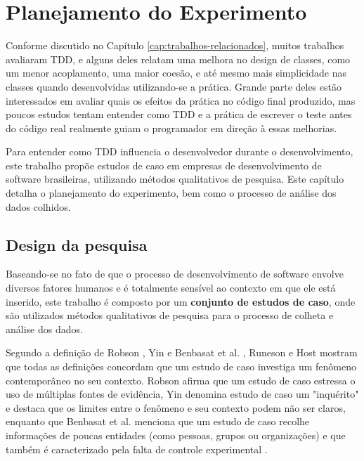 \chapter{Planejamento do Experimento}
\label{cap:planejamento}

Conforme discutido no Capítulo \ref{cap:trabalhos-relacionados}, muitos 
trabalhos avaliaram TDD, e alguns deles relatam uma melhora
no design de classes, como um menor acoplamento, uma maior coesão, e até mesmo
mais simplicidade nas classes quando desenvolvidas utilizando-se a prática. 
Grande parte deles estão interessados em avaliar quais os efeitos da prática
no código final produzido, mas poucos estudos tentam entender como TDD e a
prática de escrever o teste antes do código real realmente guiam o programador 
em direção à essas melhorias.

Para entender como TDD influencia o desenvolvedor durante o desenvolvimento,
este trabalho propõe estudos de caso em empresas de desenvolvimento de
software brasileiras, utilizando métodos qualitativos de pesquisa.
Este capítulo detalha o planejamento do experimento, bem como o processo de
análise dos dados colhidos.

\section{Design da pesquisa}

Baseando-se no fato de que o processo de desenvolvimento de software envolve 
diversos fatores humanos e é totalmente sensível ao contexto em que ele está 
inserido, este trabalho é composto por um \textbf{conjunto de estudos de caso},
onde são utilizados métodos qualitativos de pesquisa para o processo de colheta e 
análise dos dados.

Segundo a definição de Robson \cite{robson}, Yin \cite{yin} e Benbasat et
al. \cite{benbasat}, Runeson e Host mostram que todas as definições concordam
que um estudo de caso investiga um fenômeno contemporâneo no seu contexto. 
Robson afirma que um estudo de caso estressa o uso de múltiplas fontes de
evidência, Yin denomina estudo de caso um "inquérito" e destaca que os limites 
entre o fenômeno e seu contexto podem não ser claros, enquanto que Benbasat et
al. menciona que um estudo de caso recolhe informações de poucas entidades 
(como pessoas, grupos ou organizações) e que também é caracterizado pela falta
de controle experimental \cite{guidelines-case-study}.

